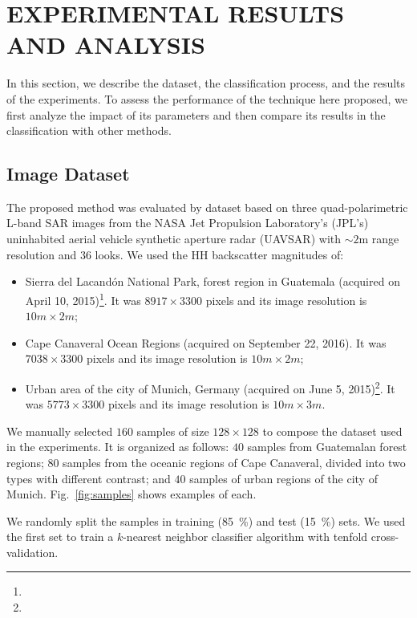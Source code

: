 \documentclass[journal]{IEEEtran}
\begin{document}
	\section{EXPERIMENTAL RESULTS AND ANALYSIS}\label{Results}
	
	In this section, we describe the dataset, 
	the classification process, and 
	the results of the experiments.
	To assess the performance of the technique here proposed, we first analyze the impact of its parameters and then compare its results in the classification with other methods.
	
	\subsection{Image Dataset}
	
	The proposed method was evaluated by dataset based on three quad-polarimetric L-band SAR images from the NASA Jet Propulsion Laboratory’s (JPL’s) uninhabited aerial vehicle synthetic aperture radar (UAVSAR) with $\sim 2$m range resolution and $36$ looks.
	We used the HH backscatter magnitudes of:
	\begin{itemize}
		\item Sierra del Lacandón National Park, forest region in Guatemala (acquired on April 10, 2015)\footnote{}. 
		It was $8917 \times 3300$ pixels and its image resolution is $10m \times 2m$;
		\item Cape Canaveral Ocean Regions (acquired on September 22, 2016).
		It was $7038 \times 3300$ pixels and its image resolution is $10m \times 2m$;
		\item Urban area of the city of Munich, Germany (acquired on June 5, 2015)\footnote{}.
		It was $5773 \times 3300$ pixels and its image resolution is $10m \times 3m$.
	\end{itemize}
	
	We manually selected $160$ samples of size $128 \times 128$ to compose the dataset used in the experiments.
	It is organized as follows:
	$40$ samples from Guatemalan forest regions;
	$80$ samples from the oceanic regions of Cape Canaveral, divided into two types with different contrast; and
	$40$ samples of urban regions of the city of Munich.
	Fig.~\ref{fig:samples} shows examples of each.
	
	
	We randomly split the samples in training (\SI{85}{\percent}) and test (\SI{15}{\percent}) sets.
	We used the first set to train a $k$-nearest neighbor classifier algorithm with tenfold cross-validation.
	
\end{document}
